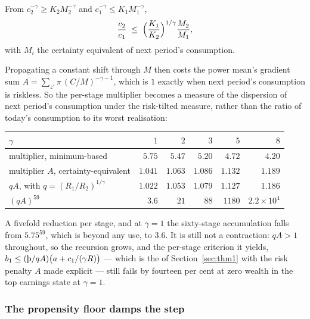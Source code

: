 \begin{proposition}\label{prop:cechain}
From $c_2^{-\gamma}\ge K_2M_2^{-\gamma}$ and $c_1^{-\gamma}\le K_1M_1^{-\gamma}$,
\[
  \frac{c_2}{c_1}\;\le\;\Bigl(\frac{K_1}{K_2}\Bigr)^{1/\gamma}\frac{M_2}{M_1},
\]
with $M_i$ the certainty equivalent of next period's consumption.
\end{proposition}

Propagating a constant shift through $M$ then costs the power mean's gradient sum
$A=\sum_{z'}\pi\,(C/M)^{-\gamma-1}$, which is $1$ exactly when next period's consumption is riskless.
So the per-stage multiplier becomes a measure of the dispersion of next period's consumption under the
risk-tilted measure, rather than the ratio of today's consumption to its worst realisation:

\begin{center}
\begin{tabular}{lrrrrr}
\toprule
$\gamma$ & $1$ & $2$ & $3$ & $5$ & $8$\\
\midrule
multiplier, minimum-based & $5.75$ & $5.47$ & $5.20$ & $4.72$ & $4.20$\\
multiplier $A$, certainty-equivalent & $\mathbf{1.041}$ & $\mathbf{1.063}$ & $\mathbf{1.086}$ & $\mathbf{1.132}$ & $\mathbf{1.189}$\\
$qA$, with $q=(R_1/R_2)^{1/\gamma}$ & $1.022$ & $1.053$ & $1.079$ & $1.127$ & $1.186$\\
$(qA)^{59}$ & $3.6$ & $21$ & $88$ & $1180$ & $2.2\times10^{4}$\\
\bottomrule
\end{tabular}
\end{center}

A fivefold reduction per stage, and at $\gamma=1$ the sixty-stage accumulation falls from
$5.75^{59}$, which is beyond any use, to $3.6$. It is still not a contraction: $qA>1$ throughout, so
the recursion grows, and the per-stage criterion it yields,
$b_1\le(\Thorn/qA)\bigl(a+c_1/(\gamma R)\bigr)$ --- which is the  of
Section~\ref{sec:thm1} with the risk penalty $A$ made explicit --- still fails by fourteen per cent at
zero wealth in the top earnings state at $\gamma=1$.

\subsubsection*{The propensity floor damps the step}

